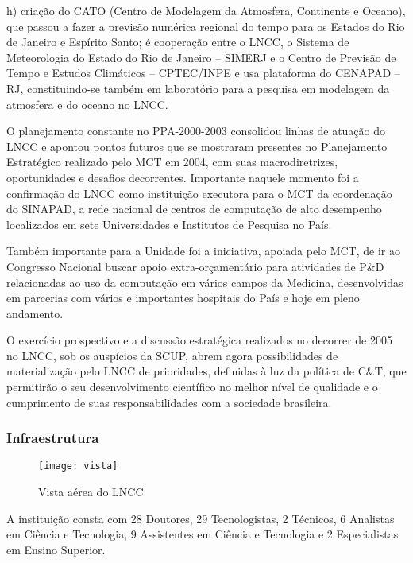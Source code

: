 \documentclass[11pt,a4paper]{article}
\begin{document}
h) criação do CATO (Centro de Modelagem da Atmosfera, Continente e Oceano), que passou a fazer a previsão numérica regional do tempo para os Estados do Rio de Janeiro e Espírito Santo; é cooperação entre o LNCC, o Sistema de Meteorologia do Estado do Rio de Janeiro – SIMERJ e o Centro de Previsão de Tempo e Estudos Climáticos – CPTEC/INPE e usa plataforma do CENAPAD – RJ, constituindo-se também em laboratório para a pesquisa em modelagem da atmosfera e do oceano no LNCC.


O planejamento constante no PPA-2000-2003 consolidou linhas de atuação do LNCC e apontou pontos futuros que se mostraram presentes no Planejamento Estratégico realizado pelo MCT em 2004, com suas macrodiretrizes, oportunidades e desafios decorrentes. Importante naquele momento foi a confirmação do LNCC como instituição executora para o MCT da coordenação do SINAPAD, a rede nacional de centros de computação de alto desempenho localizados em sete Universidades e Institutos de Pesquisa no País.

Também importante para a Unidade foi a iniciativa, apoiada pelo MCT, de ir ao Congresso Nacional buscar apoio extra-orçamentário para atividades de P$\&$D relacionadas ao uso da computação em vários campos da Medicina, desenvolvidas em parcerias com vários e importantes hospitais do País e hoje em pleno andamento.

O exercício prospectivo e a discussão estratégica realizados no decorrer de 2005 no LNCC, sob os auspícios da SCUP, abrem agora possibilidades de materialização pelo LNCC de prioridades, definidas à luz da política de C$\&$T, que permitirão o seu desenvolvimento científico no melhor nível de qualidade e o cumprimento de suas responsabilidades com a sociedade brasileira.
\subsubsection{Infraestrutura}
\begin{figure}[!htb]
\begin{center}
\texttt{[image: vista]}\\
\caption{Vista aérea do LNCC}
\end{center}
\end{figure}
A instituição consta com 28 Doutores, 29 Tecnologistas, 2 Técnicos, 6 Analistas em Ciência e Tecnologia, 9 Assistentes em Ciência e Tecnologia e 2 Especialistas em Ensino Superior.\cite{lncc_estrutura}
\end{document}
